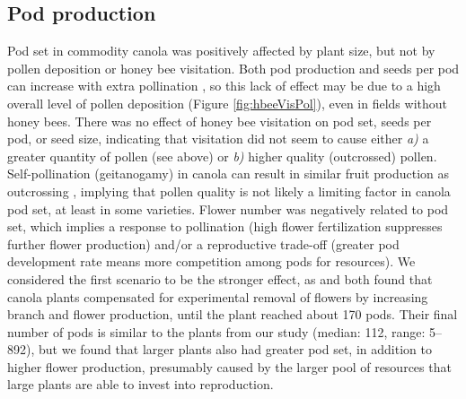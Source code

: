 \documentclass[12pt]{article} %
\begin{document}
\subsection{Pod production} %
Pod set in commodity canola was positively affected by plant size, but not by pollen deposition or honey bee visitation.
Both pod production and seeds per pod can increase with extra pollination \citep{jauker2008,sabbahi2005,sabbahi2006,duran2010}, so this lack of effect may be due to a high overall level of pollen deposition (Figure \ref{fig:hbeeVisPol}), even in fields without honey bees.
There was no effect of honey bee visitation on pod set, seeds per pod, or seed size, indicating that visitation did not seem to cause either \textit{a)} a greater quantity of pollen (see above) or \textit{b)} higher quality (outcrossed) pollen.
Self-pollination (geitanogamy) in canola can result in similar fruit production as outcrossing \citep{rosa2011}, implying that pollen quality is not likely a limiting factor in canola pod set, at least in some varieties.
Flower number was negatively related to pod set, which implies a response to pollination (high flower fertilization suppresses further flower production) and/or a reproductive trade-off (greater pod development rate means more competition among pods for resources).
We considered the first scenario to be the stronger effect, as \citet{sabbahi2006} and \citet{mesquida1981} both found that canola plants compensated for experimental removal of flowers by increasing branch and flower production, until the plant reached about 170 pods.
Their final number of pods is similar to the plants from our study (median: 112, range: 5--892), but we found that larger plants also had greater pod set, in addition to higher flower production, presumably caused by the larger pool of resources that large plants are able to invest into reproduction. 
\end{document}
